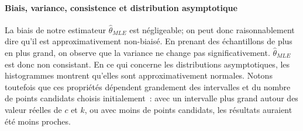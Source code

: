 \paragraph{Biais, variance, consistence et distribution asymptotique}
La biais de notre estimateur $\hat{\theta}_{MLE}$ est négligeable; on peut donc raisonnablement dire qu'il est approximativement non-biaisé. En prenant des échantillons de plus en plus grand, on observe que la variance ne change pas significativement. $\hat{\theta}_{MLE}$ est donc non consistant.
En ce qui concerne les distributions asymptotiques, les histogrammes montrent qu'elles sont approximativement normales. Notons toutefois que ces propriétés dépendent grandement des intervalles et du nombre de  points candidats choisis initialement~: avec un intervalle plus grand autour des valeur réelles de $c$ et $k$, ou avec moins de points candidats, les résultats auraient été moins proches.


